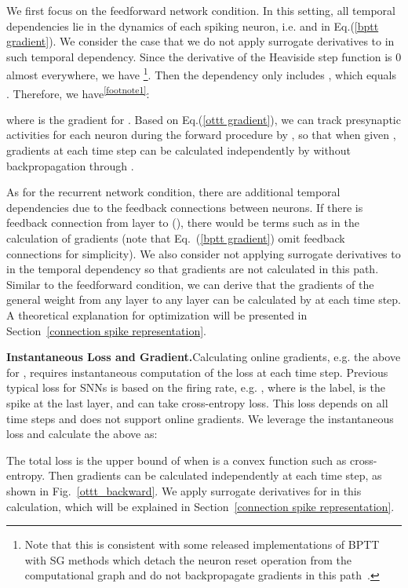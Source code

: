 \documentclass{article}
\begin{document}
We first focus on the feedforward network condition. In this setting, all temporal dependencies lie in the dynamics of each spiking neuron, i.e. {\color[rgb]{0,0.69,0.31}} and  in Eq.(\ref{bptt gradient}). We consider the case that we do not apply surrogate derivatives to  in such temporal dependency. Since the derivative of the Heaviside step function is 0 almost everywhere, we have \footnote{Note that this is consistent with some released implementations of BPTT with SG methods which detach the neuron reset operation from the computational graph and do not backpropagate gradients in this path~\cite{Fang_2021_ICCV,fang2021deep}.}. Then the dependency only includes {\color[rgb]{0,0.69,0.31}}, which equals . 
Therefore, we have\textsuperscript{\ref{footnote1}}:

where  is the gradient for . Based on Eq.(\ref{ottt gradient}), we can track presynaptic activities  for each neuron during the forward procedure by , so that when given , gradients at each time step can be calculated independently by  without backpropagation through {\color[rgb]{0,0.69,0.31}}. 

As for the recurrent network condition, there are additional temporal dependencies due to the feedback connections between neurons. If there is feedback connection from layer  to  (), there would be terms such as  in the calculation of gradients (note that Eq.~(\ref{bptt gradient}) omit feedback connections for simplicity). We also consider not applying surrogate derivatives to  in the temporal dependency so that gradients are not calculated in this path. Similar to the feedforward condition, we can derive that the gradients of the general weight  from any layer  to any layer  can be calculated by  at each time step. 
A theoretical explanation for optimization will be presented in Section~\ref{connection spike representation}. 

\textbf{Instantaneous Loss and Gradient.}\quad Calculating online gradients, e.g. the above  for , requires instantaneous computation of the loss at each time step. Previous typical loss for SNNs is based on the firing rate, e.g. , where  is the label,  is the spike at the last layer, and  can take cross-entropy loss. This loss depends on all time steps and does not support online gradients. We leverage the instantaneous loss and calculate the above  as: 
\vspace{-1mm}


The total loss  is the upper bound of  when  is a convex function such as cross-entropy. Then gradients can be calculated independently at each time step, as shown in Fig.~\ref{ottt_backward}. We apply surrogate derivatives for  in this calculation, which will be explained in Section~\ref{connection spike representation}.
\end{document}
